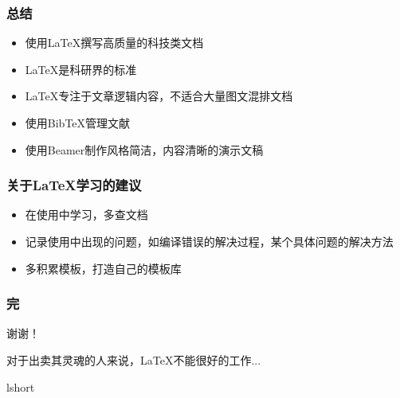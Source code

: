 \documentclass{beamer}
\begin{document}
  \frame
  {
    \frametitle{总结}
    \begin{itemize}
    \item 使用\LaTeX 撰写高质量的科技类文档
    \item \LaTeX 是科研界的标准
    \item \LaTeX 专注于文章逻辑内容，不适合大量图文混排文档
    \item 使用BibTeX管理文献
    \item 使用Beamer制作风格简洁，内容清晰的演示文稿
    \end{itemize}
  }

  \frame
  {
    \frametitle{关于\LaTeX 学习的建议}
    \begin{itemize}
    \item 在使用中学习，多查文档
    \item 记录使用中出现的问题，如编译错误的解决过程，某个具体问题的解决方法
    \item 多积累模板，打造自己的模板库
    \end{itemize}
  }

  \frame
  {
    \frametitle{完}
    \vspace{2cm}
    {\huge 谢谢！}
    \epigraph{对于出卖其灵魂的人来说，\LaTeX 不能很好的工作...}{lshort}
  }
  
\end{document}
